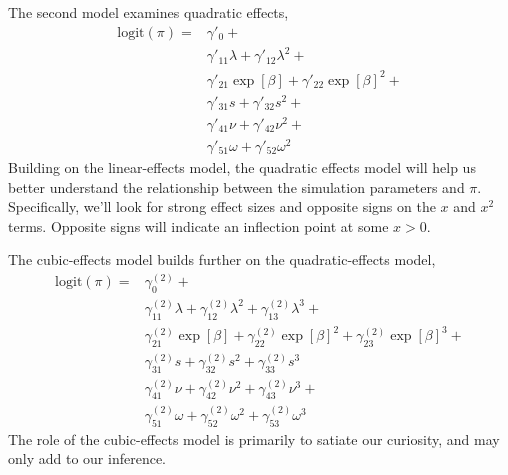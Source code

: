 The second model examines quadratic effects\footnotemark,
%
\begin{equation}
\begin{aligned}
    \text{logit}(\pi) = & \gamma'_{0} + \\ &
        \gamma'_{11} \lambda + 
        \gamma'_{12} \lambda^2 +  \\ &
        \gamma'_{21} \exp[\beta] +
        \gamma'_{22} \exp[\beta]^2 + \\ &
        \gamma'_{31} s +
        \gamma'_{32} s^2 + \\ &
        \gamma'_{41} \nu + 
        \gamma'_{42} \nu^2 +  \\ &
        \gamma'_{51} \omega +
        \gamma'_{52} \omega^2
        
\end{aligned}
\end{equation}
%
Building on the linear-effects model, the quadratic effects model will help us better understand the relationship between the simulation parameters and $\pi$. Specifically, we'll look for strong effect sizes and opposite signs on the $x$ and $x^2$ terms. Opposite signs will indicate an inflection point at some $x > 0$. 


The cubic-effects model builds further on the quadratic-effects model,
%
\begin{equation}
\begin{aligned}
    \text{logit}(\pi) = &  \gamma^{(2)}_{0} + \\ &
        \gamma^{(2)}_{11} \lambda + 
        \gamma^{(2)}_{12} \lambda^2 + 
        \gamma^{(2)}_{13} \lambda^3 + \\ &
        \gamma^{(2)}_{21} \exp[\beta] +
        \gamma^{(2)}_{22} \exp[\beta]^2 +
        \gamma^{(2)}_{23} \exp[\beta]^3 + \\ &
        \gamma^{(2)}_{31} s +
        \gamma^{(2)}_{32} s^2 +
        \gamma^{(2)}_{33} s^3 \\ &
        \gamma^{(2)}_{41} \nu + 
        \gamma^{(2)}_{42} \nu^2 + 
        \gamma^{(2)}_{43} \nu^3 + \\ &
        \gamma^{(2)}_{51} \omega +
        \gamma^{(2)}_{52} \omega^2 +
        \gamma^{(2)}_{53} \omega^3
\end{aligned}
\end{equation}
%
The role of the cubic-effects model is primarily to satiate our curiosity, and may only add to our inference. 

